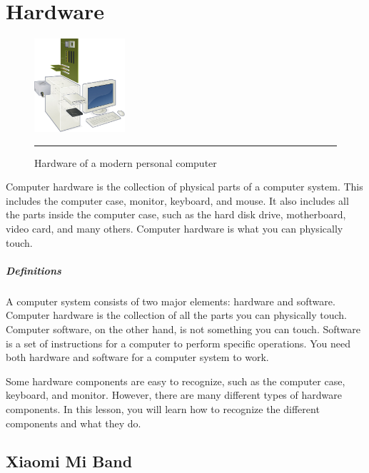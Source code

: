 \section{Hardware}

\begin{figure}
	\begin{center}
		\includegraphics[width=0.3\textwidth]{./images/hardware.jpg}
	\end{center}
	\rule{0.3\textwidth}{0.5pt}
	\caption{Hardware of a modern personal computer}
	\label{fig:hardware}
\end{figure}

Computer hardware is the collection of physical parts of a computer system. This includes the computer case, monitor, keyboard, and mouse. It also includes all the parts inside the computer case, such as the hard disk drive, motherboard, video card, and many others. Computer hardware is what you can physically touch.
\subparagraph*{Definitions}
\hfill \break
A computer system consists of two major elements: hardware and software. Computer hardware is the collection of all the parts you can physically touch. Computer software, on the other hand, is not something you can touch. Software is a set of instructions for a computer to perform specific operations. You need both hardware and software for a computer system to work.

Some hardware components are easy to recognize, such as the computer case, keyboard, and monitor. However, there are many different types of hardware components. In this lesson, you will learn how to recognize the different components and what they do.
\subsection{Xiaomi Mi Band}

